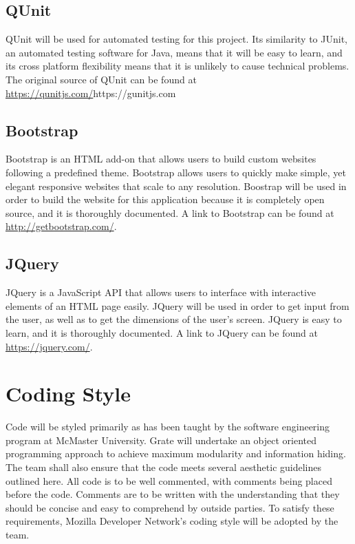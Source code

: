 \documentclass{article}
\begin{document}
\subsection{QUnit}
QUnit will be used for automated testing for this project. Its similarity to 
JUnit, an automated testing software for Java, means that it will be easy to 
learn, and its cross platform flexibility means that it is unlikely to cause 
technical problems. The original source of QUnit can be found at
\url{https://qunitjs.com/}{https://gunitjs.com}

\subsection{Bootstrap}
\textcolor{RoyalPurple}{
Bootstrap is an HTML add-on that allows users to build custom websites following 
a predefined theme. Bootstrap allows users to quickly make simple, yet elegant 
responsive websites that scale to any resolution. Boostrap will be used in order 
to build the website for this application because it is completely open source, 
and it is thoroughly documented. A link to Bootstrap can be found at 
\url{http://getbootstrap.com/}.}

\subsection{JQuery}
\textcolor{RoyalPurple}{
JQuery is a JavaScript API that allows users to interface with interactive 
elements of an HTML page easily. JQuery will be used in order to get input from 
the user, as well as to get the dimensions of the user's screen. JQuery is easy 
to learn, and it is thoroughly documented. A link to JQuery can be found at 
\url{https://jquery.com/}.}

\section{Coding Style}

Code will be styled primarily as has been taught by the software engineering 
program at McMaster University. \textcolor{RoyalPurple}{Grate} will undertake an 
object oriented 
programming approach to achieve maximum modularity and information hiding. The 
team shall also ensure that the code meets several aesthetic guidelines outlined 
here. All code is to be well commented, with comments being placed before the 
code. Comments are to be written with the understanding that they should be 
concise and easy to comprehend by outside parties. To 
\textcolor{RoyalPurple}{satisfy} these 
requirements, Mozilla Developer Network's coding style will be adopted by the 
team. 
\end{document}
